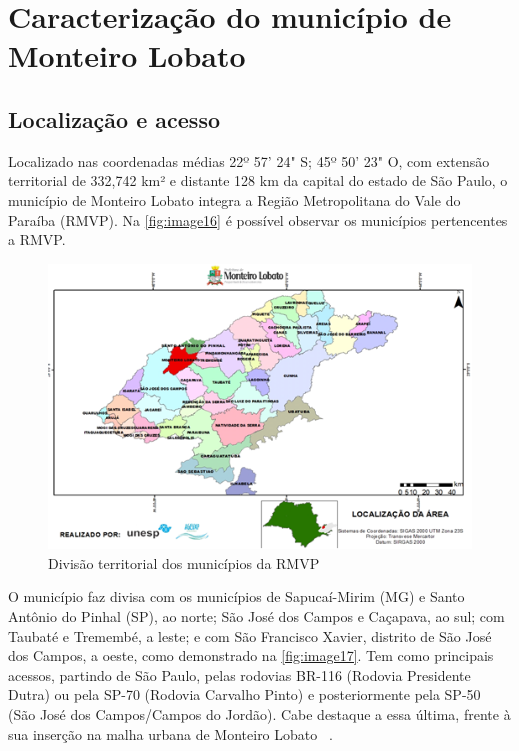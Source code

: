 \section{Caracterização do município de Monteiro Lobato}

\subsection{Localização e acesso}

Localizado nas coordenadas médias 22º 57' 24" S; 45º 50' 23" O, com extensão territorial de 332,742 km² e distante 128 km da capital do estado de São Paulo, o município de Monteiro Lobato integra a Região Metropolitana do Vale do Paraíba (RMVP). Na \autoref{fig:image16} é possível observar os municípios pertencentes a RMVP.

\begin{figure}[h!]
	\centering
	\includegraphics[width=1\linewidth]{produtos/proddois/image16}
	\caption{Divisão territorial dos municípios da RMVP}
	\label{fig:image16}
\end{figure}

O município faz divisa com os municípios de Sapucaí-Mirim (MG) e Santo Antônio do Pinhal (SP), ao norte; São José dos Campos e Caçapava, ao sul; com Taubaté e Tremembé, a leste; e com São Francisco Xavier, distrito de São José dos Campos, a oeste, como demonstrado na \autoref{fig:image17}. Tem como principais acessos, partindo de São Paulo, pelas rodovias BR-116 (Rodovia Presidente Dutra) ou pela SP-70 (Rodovia Carvalho Pinto) e posteriormente pela SP-50 (São José dos Campos/Campos do Jordão). Cabe destaque a essa última, frente à sua inserção na malha urbana de Monteiro Lobato ~\cite{MonteiroLobatoSite}.

